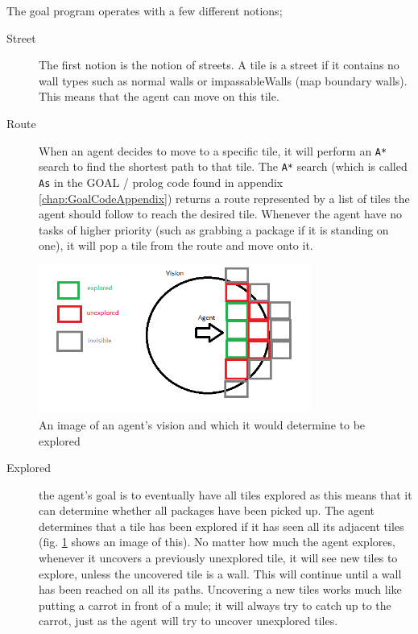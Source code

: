 The goal program operates with a few different notions; 
\begin{description}
\item [{Street}] The first notion is the notion of streets. A tile is a
street if it contains no wall types such as normal walls or impassableWalls
(map boundary walls). This means that the agent can move on this tile.
\item [{Route}] When an agent decides to move to a specific tile, it will
perform an \texttt{A{*}} search to find the shortest path to that
tile. The \texttt{A{*}} search (which is called \texttt{As} in the
GOAL / prolog code found in appendix \ref{chap:GoalCodeAppendix})
returns a route represented by a list of tiles the agent should follow
to reach the desired tile. Whenever the agent have no tasks of higher
priority (such as grabbing a package if it is standing on one), it
will pop a tile from the route and move onto it.
\end{description}
\begin{figure}
\begin{centering}
\includegraphics[width=0.8\textwidth]{VisionExploredGOALAgent}
\par\end{centering}

\caption{An image of an agent\textquoteright{}s vision and which it would determine
to be explored\label{fig:VisionExploredGoalAgent}}
\end{figure}

\begin{description}
\item [{Explored}] the agent\textquoteright{}s goal is to eventually have
all tiles explored as this means that it can determine whether all
packages have been picked up. The agent determines that a tile has
been explored if it has seen all its adjacent tiles (fig. \ref{fig:VisionExploredGoalAgent}
shows an image of this). No matter how much the agent explores, whenever
it uncovers a previously unexplored tile, it will see new tiles to
explore, unless the uncovered tile is a wall. This will continue until
a wall has been reached on all its paths. Uncovering a new tiles works
much like putting a carrot in front of a mule; it will always try
to catch up to the carrot, just as the agent will try to uncover unexplored
tiles.
\end{description}

